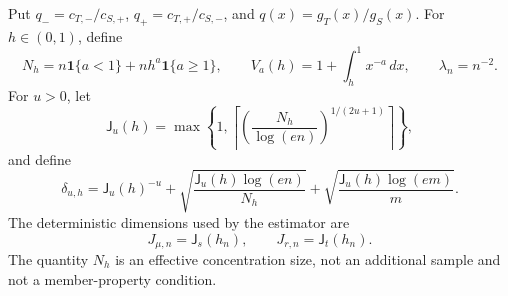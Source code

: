 Put \(q_-=c_{T,-}/c_{S,+}\), \(q_+=c_{T,+}/c_{S,-}\), and \(q(x)=g_T(x)/g_S(x)\).  For \(h\in(0,1)\), define
\[
N_h=n\mathbf 1\{a<1\}+nh^a\mathbf 1\{a\ge1\},
\qquad
V_a(h)=1+\int_h^1x^{-a}\,dx,
\qquad
\lambda_n=n^{-2}.
\]
For \(u>0\), let
\[
\mathsf J_u(h)=\max\left\{1,\left\lceil\left(\frac{N_h}{\log(en)}\right)^{1/(2u+1)}\right\rceil\right\},
\]
and define
\[
\delta_{u,h}=\mathsf J_u(h)^{-u}
+\sqrt{\frac{\mathsf J_u(h)\log(en)}{N_h}}
+\sqrt{\frac{\mathsf J_u(h)\log(em)}{m}}.
\]
The deterministic dimensions used by the estimator are
\[
J_{\mu,n}=\mathsf J_s(h_n),
\qquad
J_{r,n}=\mathsf J_t(h_n).
\]
The quantity \(N_h\) is an effective concentration size, not an additional sample and not a member-property condition.